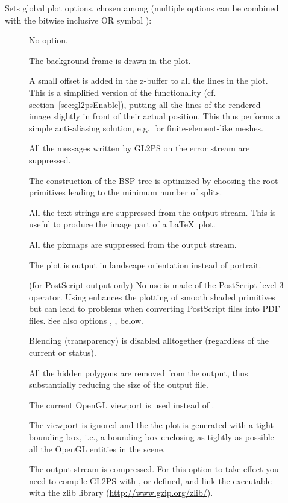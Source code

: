 \begin{description}
\item[] Sets global plot options, chosen among (multiple options
  can be combined with the bitwise inclusive OR symbol \dd{|}):

\begin{description}
\item[] No option.
\item[] The background frame is drawn in the
  plot.
\item[] A small offset is added in the z-buffer
  to all the lines in the plot. This is a simplified version of the
   functionality
  (cf. section~\ref{sec:gl2psEnable}), putting all the lines of the rendered
  image slightly in front of their actual position. This thus performs a
  simple anti-aliasing solution, e.g.\ for finite-element-like meshes.
\item[] All the messages written by GL2PS on the error
  stream are suppressed.
\item[] The construction of the BSP tree is optimized by
  choosing the root primitives leading to the minimum number of splits.
\item[] All the text strings are suppressed from
  the output stream. This is useful to produce the image part of a \LaTeX\ plot.
\item[] All the pixmaps are suppressed from the output
  stream.
\item[] The plot is output in landscape orientation
  instead of portrait.
\item[] (for PostScript output only) No use is made
  of the  PostScript level 3 operator. Using  enhances
  the plotting of smooth shaded primitives but can lead to problems when
  converting PostScript files into PDF files. See also options ,
  ,  below.
\item[] Blending (transparency) is disabled
  alltogether (regardless of the current  or 
  status).
\item[] All the hidden polygons are removed from
  the output, thus substantially reducing the size of the output file.
\item[] The current OpenGL viewport is used
  instead of .
\item[] The viewport is ignored and the
  the plot is generated with a tight bounding box, i.e., a bounding
  box enclosing as tightly as possible all the OpenGL entities in the
  scene.
\item[] The output stream is compressed. For this option
  to take effect you need to compile GL2PS with ,
   or  defined, and link the executable
  with the zlib library (\url{http://www.gzip.org/zlib/}).


\end{description}
\end{description}
